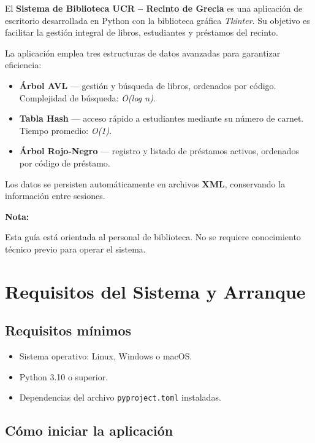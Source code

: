 \documentclass[12pt, a4paper]{article}
\newenvironment{notebox}{%
  \vspace{6pt}\par\noindent
  \begin{lrbox}{\mybox}%
    \begin{minipage}{\dimexpr\linewidth-16pt\relax}%
      \noindent\textcolor{UCRBlue}{\textbf{Nota:}}\ %
}{%
    \end{minipage}%
  \end{lrbox}%
  \setlength{\fboxsep}{8pt}%
  \colorbox{NoteBlue}{\usebox{\mybox}}%
  \vspace{6pt}\par%
}
\begin{document}
El \textbf{Sistema de Biblioteca UCR -- Recinto de Grecia} es una aplicación de escritorio
desarrollada en Python con la biblioteca gráfica \textit{Tkinter}.
Su objetivo es facilitar la gestión integral de libros, estudiantes y préstamos del recinto.

La aplicación emplea tres estructuras de datos avanzadas para garantizar eficiencia:

\begin{itemize}[leftmargin=1.8cm]
  \item \textbf{Árbol AVL} --- gestión y búsqueda de libros, ordenados por código.
        Complejidad de búsqueda: \textit{O(log n)}.
  \item \textbf{Tabla Hash} --- acceso rápido a estudiantes mediante su número de carnet.
        Tiempo promedio: \textit{O(1)}.
  \item \textbf{Árbol Rojo-Negro} --- registro y listado de préstamos activos,
        ordenados por código de préstamo.
\end{itemize}

Los datos se persisten automáticamente en archivos \textbf{XML}, conservando
la información entre sesiones.

\begin{notebox}
Esta guía está orientada al personal de biblioteca.
No se requiere conocimiento técnico previo para operar el sistema.
\end{notebox}

\section{Requisitos del Sistema y Arranque}

\subsection{Requisitos mínimos}
\begin{itemize}
  \item Sistema operativo: Linux, Windows o macOS.
  \item Python 3.10 o superior.
  \item Dependencias del archivo \texttt{pyproject.toml} instaladas.
\end{itemize}

\subsection{Cómo iniciar la aplicación}
\end{document}
